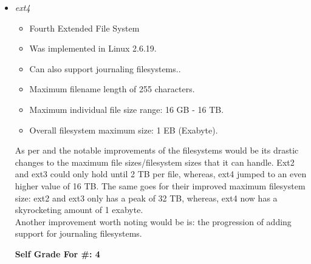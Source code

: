 \documentclass[conference]{IEEEtran}
\begin{document}
\begin{itemize}
\begin{itemize}
		\item \textit{ext4}
		\begin{itemize}
			\item Fourth Extended File System
			\item Was implemented in Linux 2.6.19.
			\item Can also support journaling filesystems..
			\item Maximum filename length of 255 characters.
			\item Maximum individual file size range: 16 GB - 16 TB. 
			\item Overall filesystem maximum size: 1 EB (Exabyte).
		\end{itemize}
	As per \textcite{extbonus} and \textcite{extbonus3} the notable improvements of the filesystems would be its drastic changes to the maximum file sizes/filesystem sizes that it can handle. Ext2 and ext3 could only hold until 2 TB per file, whereas, ext4 jumped to an even higher value of 16 TB. The same goes for their improved maximum filesystem size: ext2 and ext3 only has a peak of 32 TB, whereas, ext4 now has a skyrocketing amount of 1 exabyte. \\
	Another improvement worth noting would be is: the progression of adding support for journaling filesystems.
		
		\begin{center}
			\textbf{Self Grade For \#: 4}
		\end{center}
	\end{itemize}
\end{itemize}


\printbibliography
\end{document}
